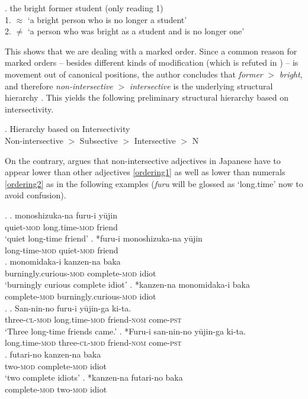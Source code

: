 \ex. the bright former student (only reading 1)\\
1. $\approx$ `a bright person who is no longer a student’\\
2. $\neq$ `a person who was bright as a student and is no longer one’

This shows that we are dealing with a marked order. Since a common reason for marked orders -- besides different kinds of modification (which is refuted in \citealt[§ 3.5.2]{panayidou:2013:in}) -- is movement out of canonical positions, the author concludes that \textit{former} $>$ \textit{bright}, and therefore \textit{non-intersective} $>$ \textit{intersective} is the underlying structural hierarchy \citep[107–111]{panayidou:2013:in}. This yields the following preliminary structural hierarchy based on intersectivity.

\ex. Hierarchy based on Intersectivity \citep{trost:2006:das, svenonius:2008:position, panayidou:2013:in}\\
Non-intersective $>$ Subsective $>$ Intersective $>$ N

On the contrary, \citet{ayano:2010:revisiting} argues that non-intersective adjectives in Japanese have to appear lower than other adjectives \ref{ordering1} as well as lower than numerals \ref{ordering2} as in the following examples (\textit{furu} will be glossed as `long.time' now to avoid confusion).

\ex. \label{ordering1} \ag. monoshizuka-na furu-i yūjin\\
quiet-\textsc{mod} long.time-\textsc{mod} friend\\
`quiet long-time friend' \hfill \citep[104]{ayano:2010:revisiting}
\bg. *furu-i monoshizuka-na yūjin\\
long-time-\textsc{mod} quiet-\textsc{mod} friend\\
\cg. monomidaka-i kanzen-na baka\\
burningly.curious-\textsc{mod} complete-\textsc{mod} idiot\\
`burningly curious complete idiot' \hfill \citep[105]{ayano:2010:revisiting}
\dg. *kanzen-na monomidaka-i baka\\
complete-\textsc{mod} burningly.curious-\textsc{mod} idiot\\

\ex. \label{ordering2} \ag. San-nin-no furu-i yūjin-ga ki-ta.\\
three-\textsc{cl}-\textsc{mod} long.time-\textsc{mod} friend-\textsc{nom} come-\textsc{pst}\\
`Three long-time friends came.' \hfill \citep[106]{ayano:2010:revisiting}
\bg. *Furu-i san-nin-no yūjin-ga ki-ta.\\
long.time-\textsc{mod} three-\textsc{cl}-\textsc{mod} friend-\textsc{nom} come-\textsc{pst}\\
\cg. futari-no kanzen-na baka\\
two-\textsc{mod} complete-\textsc{mod} idiot\\
`two complete idiots' \hfill \citep[107]{ayano:2010:revisiting}
\dg. *kanzen-na futari-no baka \\
complete-\textsc{mod} two-\textsc{mod} idiot\\

